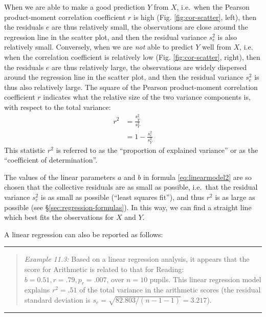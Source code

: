 \documentclass[
]{book}
\begin{document}
When we are able to make a good prediction \(Y\) from \(X\), i.e.~when the Pearson
product-moment correlation coefficient \(r\) is high
(Fig. \ref{fig:cor-scatter}, left), then the residuals \(e\) are thus relatively
small, the observations are close around the regression line in the scatter
plot, and then the residual variance \(s^2_e\) is also relatively small.
Conversely, when we are \emph{not} able to predict \(Y\) well from \(X\), i.e.
when the correlation coefficient is relatively low (Fig. \ref{fig:cor-scatter}, right),
then the residuals \(e\) are thus relatively large, the observations are widely dispersed
around the regression line in the scatter plot, and then the residual variance \(s^2_e\) is thus
also relatively large. The square of the Pearson
product-moment correlation coefficient \(r\) indicates what the relative size of the
two variance components is, with respect to the total
variance:
\begin{align}
    r^2 & = \frac{s^2_{\widehat{Y}}}{s^2_Y} \\
        & = 1 - \frac{s^2_e}{s^2_Y}
  \label{eq:r2}
\end{align}
This statistic \(r^2\) is referred to as the ``proportion of explained
variance'' or as the ``coefficient of determination''.

The values of the linear parameters \(a\) and \(b\) in
formula \eqref{eq:linearmodel2} are so chosen that the collective
residuals are as small as possible, i.e.~that the residual variance
\(s^2_e\) is as small as possible (``least squares fit''), and thus \(r^2\)
is as large as possible (see
§\ref{sec:regression-formulas}). In this way, we can find a straight line
which best fits the observations for \(X\) and \(Y\).

A linear regression can also be reported as follows:

\begin{center}\rule{0.5\linewidth}{0.5pt}\end{center}

\begin{quote}
\emph{Example 11.3:}
Based on a linear regression analysis, it appears that the score
for Arithmetic is related to that for Reading: \(b=0.51, r=.79, p_r=.007\), over \(n=10\)
pupils. This linear regression model explains \(r^2=.51\) of the
total variance in the arithmetic scores (the residual standard deviation is
\(s_e= \sqrt{82.803/(n-1-1)} = 3.217\)).
\end{quote}

\begin{center}\rule{0.5\linewidth}{0.5pt}\end{center}
\end{document}
